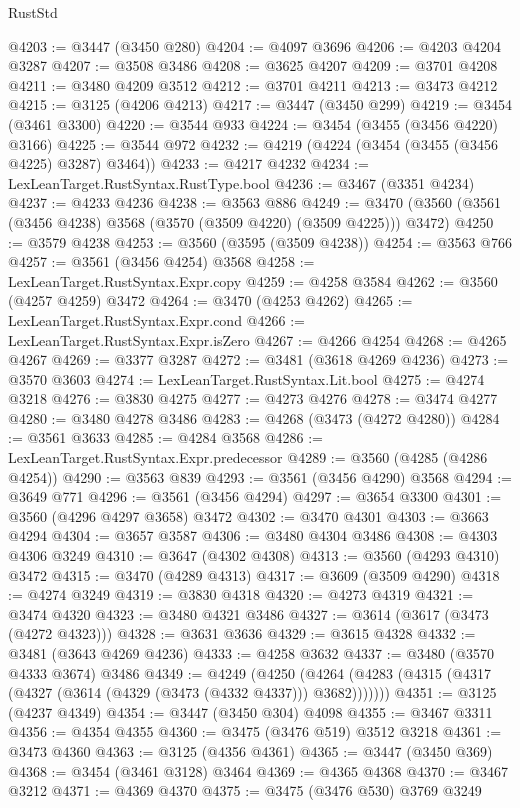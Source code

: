 \begin{lexlean}{RustStd}
\begin{coremodule}
{\begin{coremodule}
{{{{{{{{{{{{{{{{{{{{{{{{{{{{{{{{{{{{{{{{{{{{{@4203 := @3447 (@3450 @280)
@4204 := @4097 @3696
@4206 := @4203 @4204 @3287
@4207 := @3508 @3486
@4208 := @3625 @4207
@4209 := @3701 @4208
@4211 := @3480 @4209 @3512
@4212 := @3701 @4211
@4213 := @3473 @4212
@4215 := @3125 (@4206 @4213)
@4217 := @3447 (@3450 @299)
@4219 := @3454 (@3461 @3300)
@4220 := @3544 @933
@4224 := @3454 (@3455 (@3456 @4220) @3166)
@4225 := @3544 @972
@4232 := @4219 (@4224 (@3454 (@3455 (@3456 @4225) @3287) @3464))
@4233 := @4217 @4232
@4234 := LexLeanTarget.RustSyntax.RustType.bool
@4236 := @3467 (@3351 @4234)
@4237 := @4233 @4236
@4238 := @3563 @886
@4249 := @3470 (@3560 (@3561 (@3456 @4238) @3568 (@3570 (@3509 @4220) (@3509 @4225))) @3472)
@4250 := @3579 @4238
@4253 := @3560 (@3595 (@3509 @4238))
@4254 := @3563 @766
@4257 := @3561 (@3456 @4254) @3568
@4258 := LexLeanTarget.RustSyntax.Expr.copy
@4259 := @4258 @3584
@4262 := @3560 (@4257 @4259) @3472
@4264 := @3470 (@4253 @4262)
@4265 := LexLeanTarget.RustSyntax.Expr.cond
@4266 := LexLeanTarget.RustSyntax.Expr.isZero
@4267 := @4266 @4254
@4268 := @4265 @4267
@4269 := @3377 @3287
@4272 := @3481 (@3618 @4269 @4236)
@4273 := @3570 @3603
@4274 := LexLeanTarget.RustSyntax.Lit.bool
@4275 := @4274 @3218
@4276 := @3830 @4275
@4277 := @4273 @4276
@4278 := @3474 @4277
@4280 := @3480 @4278 @3486
@4283 := @4268 (@3473 (@4272 @4280))
@4284 := @3561 @3633
@4285 := @4284 @3568
@4286 := LexLeanTarget.RustSyntax.Expr.predecessor
@4289 := @3560 (@4285 (@4286 @4254))
@4290 := @3563 @839
@4293 := @3561 (@3456 @4290) @3568
@4294 := @3649 @771
@4296 := @3561 (@3456 @4294)
@4297 := @3654 @3300
@4301 := @3560 (@4296 @4297 @3658) @3472
@4302 := @3470 @4301
@4303 := @3663 @4294
@4304 := @3657 @3587
@4306 := @3480 @4304 @3486
@4308 := @4303 @4306 @3249
@4310 := @3647 (@4302 @4308)
@4313 := @3560 (@4293 @4310) @3472
@4315 := @3470 (@4289 @4313)
@4317 := @3609 (@3509 @4290)
@4318 := @4274 @3249
@4319 := @3830 @4318
@4320 := @4273 @4319
@4321 := @3474 @4320
@4323 := @3480 @4321 @3486
@4327 := @3614 (@3617 (@3473 (@4272 @4323)))
@4328 := @3631 @3636
@4329 := @3615 @4328
@4332 := @3481 (@3643 @4269 @4236)
@4333 := @4258 @3632
@4337 := @3480 (@3570 @4333 @3674) @3486
@4349 := @4249
    (@4250 (@4264 (@4283 (@4315 (@4317 (@4327 (@3614 (@4329 (@3473 (@4332 @4337))) @3682)))))))
@4351 := @3125 (@4237 @4349)
@4354 := @3447 (@3450 @304) @4098
@4355 := @3467 @3311
@4356 := @4354 @4355
@4360 := @3475 (@3476 @519) @3512 @3218
@4361 := @3473 @4360
@4363 := @3125 (@4356 @4361)
@4365 := @3447 (@3450 @369)
@4368 := @3454 (@3461 @3128) @3464
@4369 := @4365 @4368
@4370 := @3467 @3212
@4371 := @4369 @4370
@4375 := @3475 (@3476 @530) @3769 @3249
}}}}}}}}}}}}}}}}}}}}}}}}}}}}}}}}}}}}}}}}}}}}}
\end{coremodule}}
\end{coremodule}
\end{lexlean}
